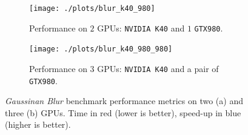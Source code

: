 \begin{figure}[!htb]
    \begin{subfigure}{1.0\textwidth}
        \caption{Performance on $2$ GPUs: \texttt{NVIDIA K40} and $1$ \texttt{GTX980}.}
        \label{fig:blur_k40_980}
        \texttt{[image: ./plots/blur\_k40\_980]}
        
    \end{subfigure}        
    \endminipage \hfill
    \vspace{5mm}
    \begin{subfigure}{1.0\textwidth}
        \texttt{[image: ./plots/blur\_k40\_980\_980]}
        \caption{Performance on $3$ GPUs: \texttt{NVIDIA K40} and a pair of \texttt{GTX980}.}
        \label{fig:blur_k40_980_980}
    \end{subfigure}
    \endminipage\hfill
    \caption[\textit{Gaussinan Blur} benchmark performance metrics.]{\textit{Gaussinan Blur} benchmark performance metrics on two (a) and three (b) GPUs. Time in red (lower is better), speed-up in blue (higher is better).}
    \label{fig:blur_performance}
\end{figure}

